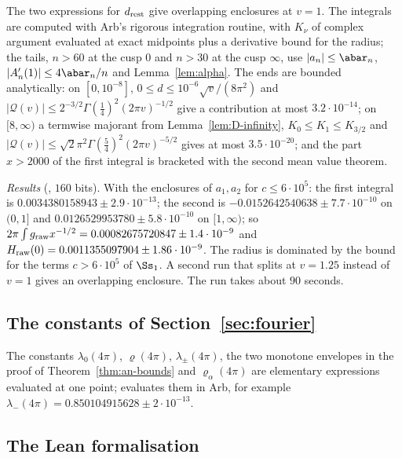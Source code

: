 The two expressions for $d_{\rm rest}$ give overlapping enclosures at $v=1$. The integrals are computed with Arb's rigorous integration routine,
with $K_\nu$ of complex argument evaluated at exact midpoints plus a derivative bound for the radius; the tails, $n>60$ at the cusp $0$
and $n>30$ at the cusp $\infty$, use
$|a_n|\le\abar_n$, $|A_n'(1)|\le4\abar_n/n$ and Lemma~\ref{lem:alpha}. The ends are bounded analytically: on $[0,10^{-8}]$, $0\le d\le10^{-6}\sqrt v/(8\pi^2)$
and $|\mathcal Q(v)|\le2^{-3/2}\Gamma(\frac14)^2(2\pi v)^{-1/2}$ give a contribution at most $3.2\cdot10^{-14}$; on $[8,\infty)$ a termwise majorant from
Lemma~\ref{lem:D-infinity}, $K_0\le K_1\le K_{3/2}$ and $|\mathcal Q(v)|\le\sqrt2\pi^2\Gamma(\frac54)^2(2\pi v)^{-5/2}$ gives at most $3.5\cdot10^{-20}$; and
the part $x>2000$ of the first integral is bracketed with the second mean value theorem.

\emph{Results} (, $160$ bits). With the enclosures of $a_1,a_2$ for $c\le6\cdot10^5$: the first integral is
$0.0034380158943\pm2.9\cdot10^{-13}$; the second is $-0.0152642540638\pm7.7\cdot10^{-10}$ on $(0,1]$ and $0.0126529953780\pm5.8\cdot10^{-10}$ on $[1,\infty)$;
so $2\pi\int g_{\rm raw}x^{-1/2}=0.00082675720847\pm1.4\cdot10^{-9}$ and $H_{\rm raw}(0)=0.0011355097904\pm1.86\cdot10^{-9}$. The radius is dominated by the
bound for the terms $c>6\cdot10^5$ of $\Ss_1$. A second run that splits at $v=1.25$ instead of $v=1$ gives an overlapping enclosure. The run takes
about $90$ seconds.

\subsection{The constants of Section~\ref{sec:fourier}}

The constants $\lambda_0(4\pi)$, $\varrho(4\pi)$, $\lambda_\pm(4\pi)$, the two monotone envelopes in the proof of Theorem~\ref{thm:an-bounds} and
$\varrho_\alpha(4\pi)$ are elementary expressions evaluated at one point;  evaluates them in Arb, for
example $\lambda_-(4\pi)=0.850104915628\pm2\cdot10^{-13}$.

\subsection{The Lean formalisation}\label{app:lean}

